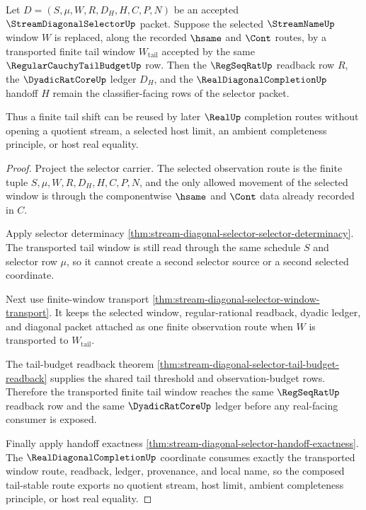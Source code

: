 \begin{theorem}
\label{thm:stream-diagonal-selector-tail-stability}
Let $D=(S,\mu,W,R,D_H,H,C,P,N)$ be an accepted $\StreamDiagonalSelectorUp$ packet. Suppose the selected $\StreamNameUp$ window $W$ is replaced, along the recorded $\hsame$ and $\Cont$ routes, by a transported finite tail window $W_{\mathrm{tail}}$ accepted by the same $\RegularCauchyTailBudgetUp$ row. Then the $\RegSeqRatUp$ readback row $R$, the $\DyadicRatCoreUp$ ledger $D_H$, and the $\RealDiagonalCompletionUp$ handoff $H$ remain the classifier-facing rows of the selector packet.

Thus a finite tail shift can be reused by later $\RealUp$ completion routes without opening a quotient stream, a selected host limit, an ambient completeness principle, or host real equality.
\end{theorem}
\begin{proof}
Project the selector carrier. The selected observation route is the finite tuple $S,\mu,W,R,D_H,H,C,P,N$, and the only allowed movement of the selected window is through the componentwise $\hsame$ and $\Cont$ data already recorded in $C$.

Apply selector determinacy \autoref{thm:stream-diagonal-selector-selector-determinacy}. The transported tail window is still read through the same schedule $S$ and selector row $\mu$, so it cannot create a second selector source or a second selected coordinate.

Next use finite-window transport \autoref{thm:stream-diagonal-selector-window-transport}. It keeps the selected window, regular-rational readback, dyadic ledger, and diagonal packet attached as one finite observation route when $W$ is transported to $W_{\mathrm{tail}}$.

The tail-budget readback theorem \autoref{thm:stream-diagonal-selector-tail-budget-readback} supplies the shared tail threshold and observation-budget rows. Therefore the transported finite tail window reaches the same $\RegSeqRatUp$ readback row and the same $\DyadicRatCoreUp$ ledger before any real-facing consumer is exposed.

Finally apply handoff exactness \autoref{thm:stream-diagonal-selector-handoff-exactness}. The $\RealDiagonalCompletionUp$ coordinate consumes exactly the transported window route, readback, ledger, provenance, and local name, so the composed tail-stable route exports no quotient stream, host limit, ambient completeness principle, or host real equality.
\end{proof}

